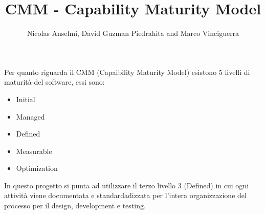 \documentclass{article}
\title{CMM - Capability Maturity Model}
\author{Nicolas Anselmi, David Guzman Piedrahita and Marco Vinciguerra}
\begin{document}
\maketitle
Per quanto riguarda il CMM (Capaibility Maturity Model) esistono 5 livelli di maturità del software, essi sono:
\begin{itemize}
    \item Initial
    \item Managed
    \item Defined
    \item Measurable
    \item Optimization
\end{itemize}
In questo progetto si punta ad utilizzare il terzo livello 3 (Defined) in cui ogni attività viene documentata
e standardadizzata per l'intera organizzazione del processo per il design, development e testing.
\end{document}
